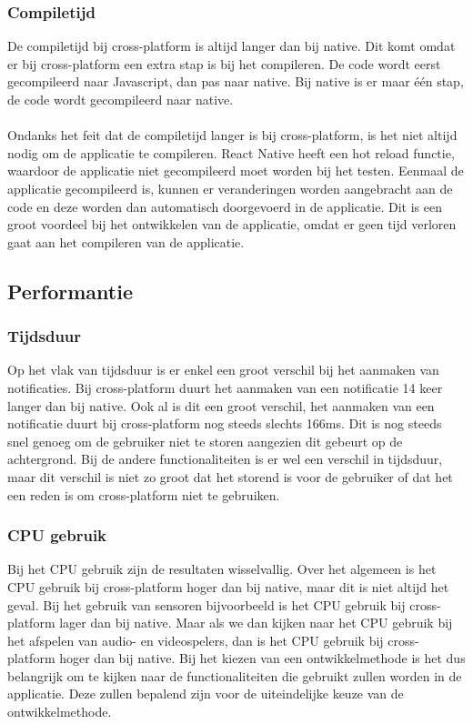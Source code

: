 \subsubsection{Compiletijd}
De compiletijd bij cross-platform is altijd langer dan bij native. Dit komt omdat er bij cross-platform
een extra stap is bij het compileren. De code wordt eerst gecompileerd naar Javascript, dan pas naar native.
Bij native is er maar één stap, de code wordt gecompileerd naar native.
\\\\
Ondanks het feit dat de compiletijd langer is bij cross-platform, is het niet altijd nodig om de applicatie te compileren.
React Native heeft een hot reload functie, waardoor de applicatie niet gecompileerd moet worden bij het testen.
Eenmaal de applicatie gecompileerd is, kunnen er veranderingen worden aangebracht aan de code en deze worden dan
automatisch doorgevoerd in de applicatie. Dit is een groot voordeel bij het ontwikkelen van de applicatie,
omdat er geen tijd verloren gaat aan het compileren van de applicatie.

\subsection{Performantie}
\subsubsection{Tijdsduur}
Op het vlak van tijdsduur is er enkel een groot verschil bij het aanmaken van notificaties.
Bij cross-platform duurt het aanmaken van een notificatie 14 keer langer dan bij native.
Ook al is dit een groot verschil, het aanmaken van een notificatie duurt bij cross-platform 
nog steeds slechts 166ms. Dit is nog steeds snel genoeg om de gebruiker niet te storen 
aangezien dit gebeurt op de achtergrond. Bij de andere functionaliteiten is er wel een verschil
in tijdsduur, maar dit verschil is niet zo groot dat het storend is voor de gebruiker of dat het een 
reden is om cross-platform niet te gebruiken.

\subsubsection{CPU gebruik}
Bij het CPU gebruik zijn de resultaten wisselvallig. Over het algemeen is het CPU gebruik bij cross-platform
hoger dan bij native, maar dit is niet altijd het geval. Bij het gebruik van sensoren bijvoorbeeld is het CPU gebruik
bij cross-platform lager dan bij native. Maar als we dan kijken naar het CPU gebruik bij het afspelen van audio- en 
videospelers, dan is het CPU gebruik bij cross-platform hoger dan bij native. Bij het kiezen van een ontwikkelmethode is het 
dus belangrijk om te kijken naar de functionaliteiten die gebruikt zullen worden in de applicatie. 
Deze zullen bepalend zijn voor de uiteindelijke keuze van de ontwikkelmethode.

